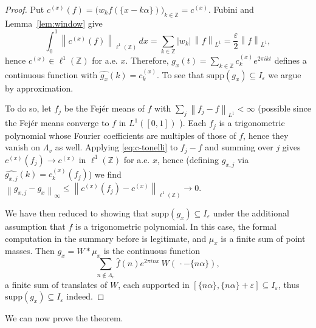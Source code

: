 \documentclass[reqno,a4paper,12pt]{amsart}
\numberwithin{equation}{section}
\def\Z{{\mathbb Z}}
\newcommand{\supp}{{\mathrm{supp}}}
\newcommand\1{\mathds{1}}
\newcommand{\norm}[1]{\left\lVert #1 \right\rVert}
\begin{document}
\begin{proof}
Put
$c^{(x)}(f)=\bigl(w_kf(\{x-k\alpha\})\bigr)_{k\in\Z}=c^{(x)}$. Fubini and Lemma~\ref{lem:window} give
\begin{equation}\label{eq:c-tonelli}
 \int_0^1\norm{c^{(x)}(f)}_{\ell^1(\Z)}\, dx
 =\sum_{k\in\Z}|w_k|\,\norm{f}_{L^1}
 =\frac\varepsilon2\norm{f}_{L^1} ,
\end{equation}
hence $c^{(x)}\in\ell^1(\Z)$ for a.e. $x$. Therefore,
$g_x(t)=\sum_{k\in\Z}c^{(x)}_ke^{2\pi i kt}$ defines a continuous
function with $\widehat{g_x}(k)=c^{(x)}_k$. To see that $\supp (g_x)\subseteq I_\varepsilon$ we argue by approximation.

To do so, let $f_j$ be the Fej\'er means of $f$ with
$\sum_j\norm{f_j-f}_{L^1}<\infty$ (possible since the Fej\'er
means converge to $f$ in $L^1([0,1])$
\cite[Chapter~I]{Katznelson2004}).
Each $f_j$ is a trigonometric polynomial whose Fourier coefficients are
multiples of those of $f$, hence they vanish on $\Lambda_v$ as well.
Applying \eqref{eq:c-tonelli} to $f_j-f$ and summing over $j$ gives
$c^{(x)}(f_j)\to c^{(x)}$ in $\ell^1(\Z)$ for a.e. $x$, hence (defining $g_{x,j}$ via $\widehat{g_{x,j}}(k)=c^{(x)}_k(f_j)$) we find 
$\norm{g_{x,j}-g_x}_\infty\leq\norm{c^{(x)}(f_j)-c^{(x)}}_{\ell^1(\Z)}
\to0$.

We have then reduced to showing that
$\supp (g_{x})\subseteq I_\varepsilon$ under the additional assumption that $f$ is a trigonometric
polynomial. In this case, the formal computation in the summary before is legitimate, and $\mu_x$ is a finite sum of point
masses. Then $g_x=W*\mu_x$ is the continuous function
\[
 \sum_{n\notin\Lambda_v}\widehat f(n)e^{2\pi i nx}\,W(\,\cdot-\{n\alpha\}) ,
\]
a finite sum of translates of $W$, each supported in
$[\{n\alpha\},\{n\alpha\}+\varepsilon]\subseteq I_\varepsilon$, thus
$\supp (g_x)\subseteq I_\varepsilon$ indeed.
\end{proof}

We can now prove the theorem.
\end{document}
